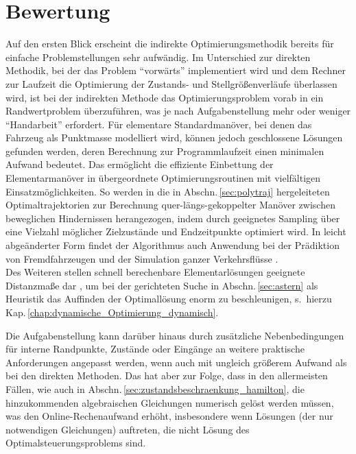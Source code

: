 \section{Bewertung}
Auf den ersten Blick erscheint die indirekte Optimierungsmethodik bereits für einfache Problemstellungen sehr aufwändig. Im Unterschied zur direkten Methodik, bei der das Problem "`vorwärts"' implementiert wird und dem Rechner zur Laufzeit die Optimierung der Zustands- und Stellgrößenverläufe überlassen wird, ist bei der indirekten Methode das Optimierungsproblem vorab in ein Randwertproblem überzuführen, was je nach Aufgabenstellung mehr oder weniger "`Handarbeit"' erfordert. Für elementare Standardmanöver, bei denen das Fahrzeug als Punktmasse modelliert wird, können jedoch geschlossene Lösungen gefunden werden, deren Berechnung zur Programmlaufzeit einen minimalen Aufwand bedeutet. Das ermöglicht die effiziente Einbettung der Elementarmanöver in übergeordnete Optimierungsroutinen mit vielfältigen Einsatzmöglichkeiten. So werden in  die in Abschn.\,\ref{sec:polytraj} hergeleiteten Optimaltrajektorien zur Berechnung quer-längs-gekoppelter Manöver zwischen beweglichen Hindernissen herangezogen, indem durch geeignetes Sampling über eine Vielzahl möglicher Zielzustände und Endzeitpunkte optimiert wird. In leicht abgeänderter Form findet der Algorithmus auch Anwendung bei der Prädiktion von Fremdfahrzeugen \cite{houenou2013vehicle} und der Simulation ganzer Verkehrsflüsse \cite{xu2011micro}. \\
Des Weiteren stellen schnell berechenbare Elementarlösungen geeignete Distanzmaße dar \cite{soueres1998optimal}, um bei der gerichteten Suche in Abschn.\,\ref{sec:astern} als Heuristik das Auffinden der Optimallösung enorm zu beschleunigen, s.\ hierzu Kap.\,\ref{chap:dynamische_Optimierung_dynamisch}. %



Die Aufgabenstellung kann darüber hinaus durch zusätzliche Nebenbedingungen für interne Randpunkte, Zustände oder Eingänge an weitere praktische Anforderungen angepasst werden, wenn auch mit ungleich größerem Aufwand als bei den direkten Methoden. Das hat aber zur Folge, dass in den allermeisten Fällen, wie auch in Abschn.\,\ref{sec:zustandsbeschraenkung_hamilton}, die hinzukommenden algebraischen Gleichungen numerisch gelöst werden müssen, was den Online-Rechenaufwand erhöht, insbesondere wenn Lösungen (der nur notwendigen Gleichungen) auftreten, die nicht Lösung des Optimalsteuerungsproblems sind.

